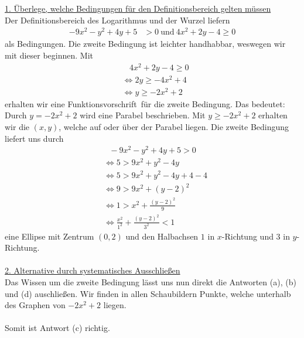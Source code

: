 \underline{1. Überlege, welche Bedingungen für den Definitionsbereich gelten müssen}\\
Der Definitionsbereich des Logarithmus und der Wurzel liefern
\begin{align*}
-9x^2 -y^2 +4y +5 &> 0 
\ \text{und} \
4x^2 + 2y - 4 \geq 0
\end{align*}
als Bedingungen.
Die zweite Bedingung ist leichter handhabbar, weswegen wir mit dieser beginnen.
Mit
\begin{align*}
&\ \ \ \ 4x^2 + 2y -4 \geq 0\\ 
&\Leftrightarrow
2y \geq -4x^2 +4\\
&\Leftrightarrow
y \geq -2x^2 +2
\end{align*}
erhalten wir eine \glqq Funktionsvorschrift\grqq~für die zweite Bedingung.
Das bedeutet:
Durch $y = -2x^2 +2$ wird eine Parabel beschrieben.
Mit $y \geq -2x^2 +2 $ erhalten wir die $(x,y)$, welche auf oder über der Parabel liegen.
Die zweite Bedingung liefert uns durch
\begin{align*}
&\ \ \ -9x^2 -y^2 + 4 y +5 > 0\\
&\Leftrightarrow
5 > 9x^2 +y^2 -4y\\
&\Leftrightarrow
5 >9x^2 +y^2 -4y +4 -4\\
&\Leftrightarrow
9 > 9x^2 + (y-2)^2\\
&\Leftrightarrow
1 > x^2 + \frac{(y-2)^2}{9}\\
&\Leftrightarrow
\frac{x^2}{1^2} + \frac{(y-2)^2}{3^2} < 1
\end{align*}
eine Ellipse mit Zentrum $(0,2)$ und den Halbachsen $1$ in $x$-Richtung und $3$ in $y$-Richtung.
\\
\\

\underline{2. Alternative durch systematisches Ausschließen}\\
Das Wissen um die zweite Bedingung lässt uns nun direkt die 
Antworten (a), (b) und (d) auschließen.
Wir finden in allen Schaubildern Punkte, welche unterhalb des Graphen von $-2x^2 +2$ liegen.\\
\\

Somit ist Antwort (c) richtig.

\newpage

